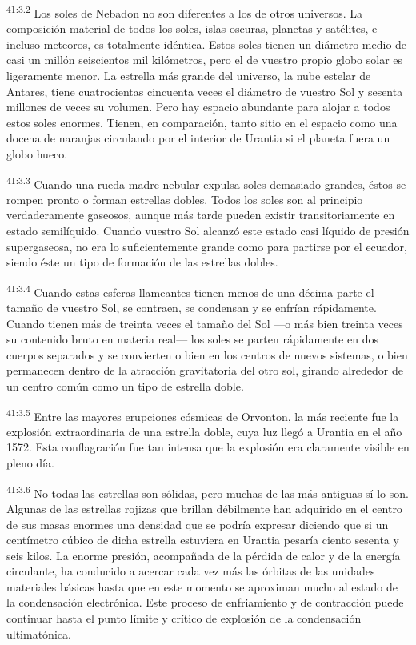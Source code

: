 \par
\textsuperscript{41:3.2} Los soles de Nebadon no son diferentes a los de otros universos. La composición material de todos los soles, islas oscuras, planetas y satélites, e incluso meteoros, es totalmente idéntica. Estos soles tienen un diámetro medio de casi un millón seiscientos mil kilómetros, pero el de vuestro propio globo solar es ligeramente menor. La estrella más grande del universo, la nube estelar de Antares, tiene cuatrocientas cincuenta veces el diámetro de vuestro Sol y sesenta millones de veces su volumen. Pero hay espacio abundante para alojar a todos estos soles enormes. Tienen, en comparación, tanto sitio en el espacio como una docena de naranjas circulando por el interior de Urantia si el planeta fuera un globo hueco.

\par
\textsuperscript{41:3.3} Cuando una rueda madre nebular expulsa soles demasiado grandes, éstos se rompen pronto o forman estrellas dobles. Todos los soles son al principio verdaderamente gaseosos, aunque más tarde pueden existir transitoriamente en estado semilíquido. Cuando vuestro Sol alcanzó este estado casi líquido de presión supergaseosa, no era lo suficientemente grande como para partirse por el ecuador, siendo éste un tipo de formación de las estrellas dobles.

\par
\textsuperscript{41:3.4} Cuando estas esferas llameantes tienen menos de una décima parte el tamaño de vuestro Sol, se contraen, se condensan y se enfrían rápidamente. Cuando tienen más de treinta veces el tamaño del Sol ---o más bien treinta veces su contenido bruto en materia real--- los soles se parten rápidamente en dos cuerpos separados y se convierten o bien en los centros de nuevos sistemas, o bien permanecen dentro de la atracción gravitatoria del otro sol, girando alrededor de un centro común como un tipo de estrella doble.

\par
\textsuperscript{41:3.5} Entre las mayores erupciones cósmicas de Orvonton, la más reciente fue la explosión extraordinaria de una estrella doble, cuya luz llegó a Urantia en el año 1572. Esta conflagración fue tan intensa que la explosión era claramente visible en pleno día.

\par
\textsuperscript{41:3.6} No todas las estrellas son sólidas, pero muchas de las más antiguas sí lo son. Algunas de las estrellas rojizas que brillan débilmente han adquirido en el centro de sus masas enormes una densidad que se podría expresar diciendo que si un centímetro cúbico de dicha estrella estuviera en Urantia pesaría ciento sesenta y seis kilos. La enorme presión, acompañada de la pérdida de calor y de la energía circulante, ha conducido a acercar cada vez más las órbitas de las unidades materiales básicas hasta que en este momento se aproximan mucho al estado de la condensación electrónica. Este proceso de enfriamiento y de contracción puede continuar hasta el punto límite y crítico de explosión de la condensación ultimatónica.

